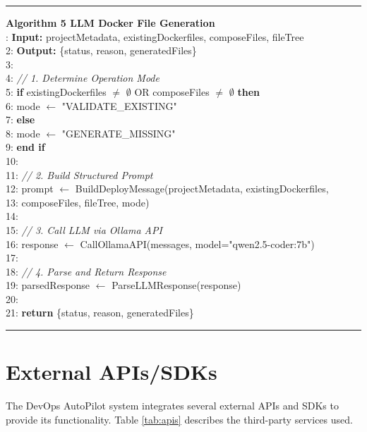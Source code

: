 \noindent\rule{\textwidth}{0.4pt}
\textbf{Algorithm 5 LLM Docker File Generation}\\
: \textbf{Input:} projectMetadata, existingDockerfiles, composeFiles, fileTree\\
2: \textbf{Output:} \{status, reason, generatedFiles\}\\
3:\\
4: \textit{// 1. Determine Operation Mode}\\
5: \textbf{if} existingDockerfiles $\neq$ $\emptyset$ OR composeFiles $\neq$ $\emptyset$ \textbf{then}\\
6: \hspace{0.5cm}mode $\leftarrow$ "VALIDATE\_EXISTING"\\
7: \textbf{else}\\
8: \hspace{0.5cm}mode $\leftarrow$ "GENERATE\_MISSING"\\
9: \textbf{end if}\\
10:\\
11: \textit{// 2. Build Structured Prompt}\\
12: prompt $\leftarrow$ BuildDeployMessage(projectMetadata, existingDockerfiles,\\
13: \hspace{3.5cm}composeFiles, fileTree, mode)\\
14:\\
15: \textit{// 3. Call LLM via Ollama API}\\
16: response $\leftarrow$ CallOllamaAPI(messages, model="qwen2.5-coder:7b")\\
17:\\
18: \textit{// 4. Parse and Return Response}\\
19: parsedResponse $\leftarrow$ ParseLLMResponse(response)\\
20:\\
21: \textbf{return} \{status, reason, generatedFiles\}\\
\noindent\rule{\textwidth}{0.4pt}

\section{External APIs/SDKs}

The DevOps AutoPilot system integrates several external APIs and SDKs to provide its functionality. Table \ref{tab:apis} describes the third-party services used.

